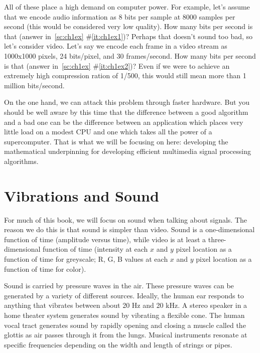 All of these place a high demand on computer power. For example, let's
assume that we encode audio information as 8 bits per sample at 8000
samples per second (this would be considered very low quality). How
many bits per second is that (answer in~\ref{sc:ch1ex}
\#\ref{it:ch1ex1})? Perhaps that doesn't sound too bad, so let's
consider video. Let's say we encode each frame in a video stream as
1000x1000 pixels, 24 bits/pixel, and 30 frames/second.  How many bits
per second is that (answer in~\ref{sc:ch1ex}
\#\ref{it:ch1ex2})?
Even if we were to achieve an extremely high compression ration of
1/500, this would still mean more than 1 million bits/second.

On the one hand, we can attack this problem through faster
hardware. But you should be well aware by this time that the
difference between a good algorithm and a bad one can be the
difference between an application which places very little load on a
modest CPU and one which takes all the power of a supercomputer. That
is what we will be focusing on here: developing the mathematical
underpinning for developing efficient multimedia signal processing
algorithms.

\section{Vibrations and Sound}

For much of this book, we will focus on sound when talking about
signals. The reason we do this is that sound is simpler than
video. Sound is a one-dimensional function of time (amplitude versus
time), while video is at least a three-dimensional function of time
(intensity at each $x$ and $y$ pixel location as a function of time
for greyscale; R, G, B values at each $x$ and $y$ pixel location as a
function of time for color).

Sound is carried by pressure waves in the air. These pressure waves can be generated by a variety of different sources. Ideally, the human ear responds to anything that vibrates between about 20 Hz and 20 kHz. A stereo speaker in a home theater system generates sound by vibrating a flexible cone. The human vocal tract generates sound by rapidly opening and closing a muscle called the glottis as air passes through it from the lungs. Musical instruments resonate at specific frequencies depending on the width and length of strings or pipes.

